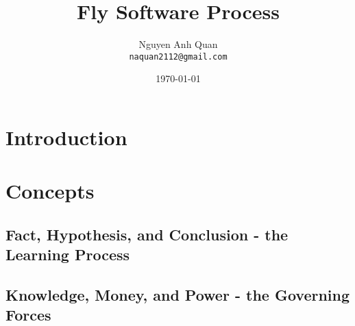 \documentclass[10pt,a4paper]{report}
\begin{document}
\title{Fly Software Process}
\author{Nguyen Anh Quan\\
  \texttt{naquan2112@gmail.com}}
\date{\today}
\maketitle

\chapter{Introduction}

\lipsum[1-10]

\chapter{Concepts}
\section[Learning Process]{Fact, Hypothesis, and Conclusion - the Learning Process}

\lipsum[1-20]

\section[Governing Forces]{Knowledge, Money, and Power - the Governing Forces}

\lipsum[1-20]
\end{document}
